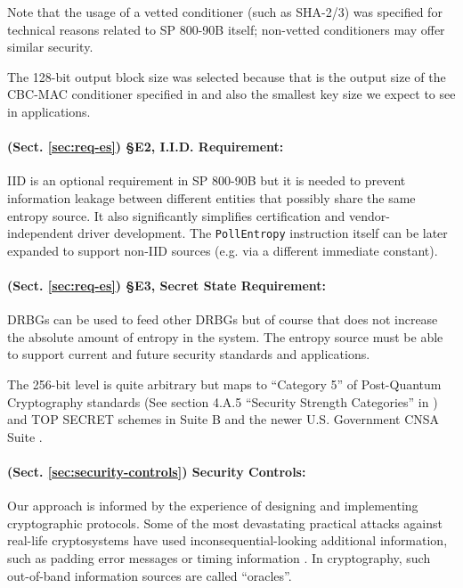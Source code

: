    Note that the usage of a vetted conditioner (such as SHA-2/3) was
    specified for technical reasons related to SP 800-90B itself;
    non-vetted conditioners may offer similar security.

    The 128-bit output block size was selected because that is the output
    size of the CBC-MAC conditioner specified in \cite{TuBaKe+18} and also
    the smallest key size we expect to see in applications.

    \paragraph{(Sect. \ref{sec:req-es}) \S E2, I.I.D. Requirement:}
    IID is an optional requirement in SP 800-90B \cite{TuBaKe+18} but it
    is needed to prevent information leakage between different entities that
    possibly share the same entropy source. It also significantly
    simplifies certification and vendor-independent driver development.
    The \verb|PollEntropy| instruction itself can be later expanded
    to support non-IID sources (e.g. via a different immediate constant).

    \paragraph{(Sect. \ref{sec:req-es}) \S E3, Secret State Requirement:}
    DRBGs can be used to feed other DRBGs but of course that does not
    increase the absolute amount of entropy in the system.
    The entropy source must be able to support current and future security
    standards and applications.

    The 256-bit level is quite arbitrary but maps to
    ``Category 5'' of Post-Quantum Cryptography standards (See section 4.A.5
    ``Security Strength Categories'' in \cite{NI16}) and TOP SECRET schemes
    in Suite B and the newer U.S. Government CNSA Suite \cite{NS15}.

    \paragraph{(Sect. \ref{sec:security-controls}) Security Controls:}
    Our approach is informed by the experience of designing and implementing
    cryptographic protocols. Some of the most devastating practical attacks
    against real-life cryptosystems have used inconsequential-looking
    additional information, such as padding error messages \cite{BaFoKa+12}
    or timing information \cite{MoSuEi+20}. In cryptography, such
    out-of-band information sources  are called ``oracles''.

